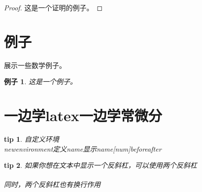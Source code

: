 \documentclass[12pt, a4paper]{article}
\newtheorem{example}{例子}[section]
\newtheorem{tips}{tip}[section]
\begin{document}
\begin{proof}
    这是一个证明的例子。
\end{proof}

\section{例子}
展示一些数学例子。

\begin{example}
    这是一个例子。
\end{example}

\section{一边学latex一边学常微分}

\begin{tips}
自定义环境  
\\newenvironment{定义name}{显示name}[num]{before}{after}  
\end{tips}
\begin{tips}
如果你想在文本中显示一个反斜杠，可以使用两个反斜杠 \\ \\
同时，两个反斜杠也有换行作用
\end{tips}
\end{document}
